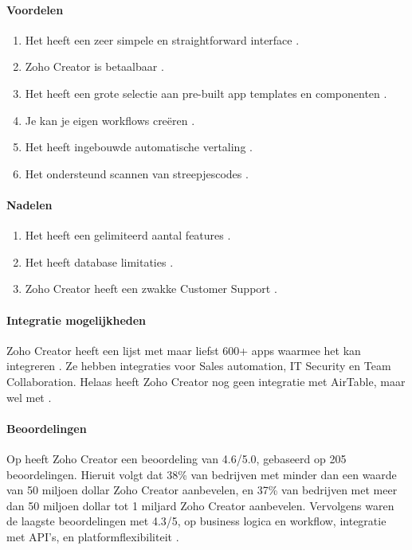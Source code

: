 \paragraph*{Voordelen}
\begin{enumerate}
    \item Het heeft een zeer simpele en straightforward interface \autocite{Marvin2017Zoho}.
    \item Zoho Creator is betaalbaar  \autocite{Marvin2017Zoho}.
    \item Het heeft een grote selectie aan pre-built app templates en componenten \autocite{Marvin2017Zoho}.
    \item Je kan je eigen workflows creëren \autocite{Marvin2017Zoho}.
    \item Het heeft ingebouwde automatische vertaling \autocite{Marvin2017Zoho}.
    \item Het ondersteund scannen van streepjescodes \autocite{Marvin2017Zoho}.
\end{enumerate}


\paragraph*{Nadelen}
\begin{enumerate}
    \item Het heeft een gelimiteerd aantal features \autocite{G22024}.
    \item Het heeft database limitaties \autocite{G22024}.
    \item Zoho Creator heeft een zwakke Customer Support \autocite{G22024}.
\end{enumerate}

\paragraph{Integratie mogelijkheden}
Zoho Creator heeft een lijst met maar liefst 600+ apps waarmee het kan integreren \autocite{ZohoCorporation2024b}. Ze hebben integraties voor Sales automation, IT Security en Team Collaboration.
Helaas heeft Zoho Creator nog geen integratie met AirTable, maar wel met \textcite{MAKE.com2024}.

\paragraph{Beoordelingen}
Op \textcite{Gartner2024} heeft Zoho Creator een beoordeling van 4.6/5.0, gebaseerd op 205 beoordelingen. Hieruit volgt dat 38\% van bedrijven met minder dan een waarde van 50 miljoen dollar Zoho Creator aanbevelen, 
en 37\% van bedrijven met meer dan 50 miljoen dollar tot 1 miljard Zoho Creator aanbevelen. Vervolgens waren de laagste beoordelingen met 4.3/5, op business logica en workflow, integratie met API's, en platformflexibiliteit \autocite{Gartner2024}.
